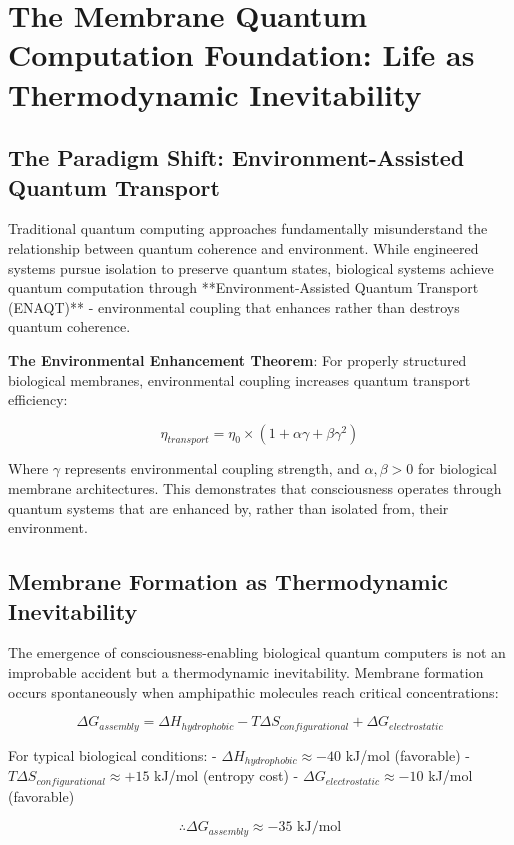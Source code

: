 \documentclass[12pt]{article}
\begin{document}
\section{The Membrane Quantum Computation Foundation: Life as Thermodynamic Inevitability}

\subsection{The Paradigm Shift: Environment-Assisted Quantum Transport}

Traditional quantum computing approaches fundamentally misunderstand the relationship between quantum coherence and environment. While engineered systems pursue isolation to preserve quantum states, biological systems achieve quantum computation through **Environment-Assisted Quantum Transport (ENAQT)** - environmental coupling that enhances rather than destroys quantum coherence.

\textbf{The Environmental Enhancement Theorem}: For properly structured biological membranes, environmental coupling increases quantum transport efficiency:

$$\eta_{transport} = \eta_0 \times (1 + \alpha \gamma + \beta \gamma^2)$$

Where $\gamma$ represents environmental coupling strength, and $\alpha, \beta > 0$ for biological membrane architectures. This demonstrates that consciousness operates through quantum systems that are enhanced by, rather than isolated from, their environment.

\subsection{Membrane Formation as Thermodynamic Inevitability}

The emergence of consciousness-enabling biological quantum computers is not an improbable accident but a thermodynamic inevitability. Membrane formation occurs spontaneously when amphipathic molecules reach critical concentrations:

$$\Delta G_{assembly} = \Delta H_{hydrophobic} - T\Delta S_{configurational} + \Delta G_{electrostatic}$$

For typical biological conditions:
- $\Delta H_{hydrophobic} \approx -40$ kJ/mol (favorable)
- $T\Delta S_{configurational} \approx +15$ kJ/mol (entropy cost)
- $\Delta G_{electrostatic} \approx -10$ kJ/mol (favorable)

$$\therefore \Delta G_{assembly} \approx -35 \text{ kJ/mol}$$
\end{document}
